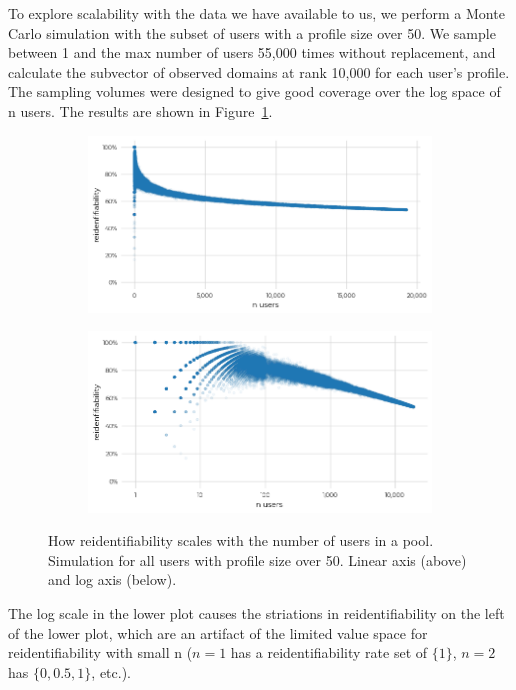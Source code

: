 \documentclass[letterpaper,twocolumn,10pt]{article}
\begin{document}
To explore scalability with the data we have available to us, we perform a Monte Carlo simulation with the subset of users with a profile size over 50. We sample between 1 and the max number of users 55,000 times without replacement, and calculate the subvector of observed domains at rank 10,000 for each user's profile. The sampling volumes were designed to give good coverage over the log space of n users. The results are shown in Figure~\ref{fig:rejoin-scaling}.
%
\begin{figure}[htbp]
\begin{subfigure}{.9\linewidth}
    \centering
    \includegraphics[width=0.9\linewidth]{figures/4-f-scalability-linear.png}
\end{subfigure}
\begin{subfigure}{.9\linewidth}
    \centering
    \includegraphics[width=0.9\linewidth]{figures/4-f-scalability-log.png}
\end{subfigure}
\caption{How reidentifiability scales with the number of users in a pool. Simulation for all users with profile size over 50. Linear axis (above) and log axis (below).}
\label{fig:rejoin-scaling}
\end{figure}
%
The log scale in the lower plot causes the striations in reidentifiability on the left of the lower plot, which are an artifact of the limited value space for reidentifiability with small n ($n=1$ has a reidentifiability rate set of $\{1\}$, $n=2$ has $\{0, 0.5, 1\}$, etc.).
\end{document}

